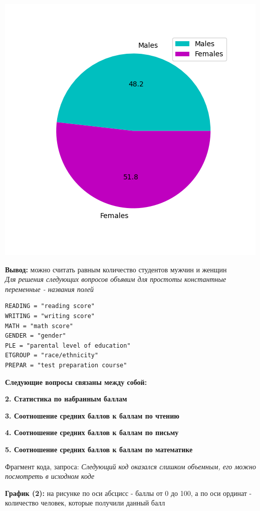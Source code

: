 \documentclass[12pt,a4paper]{article}
\begin{document}
\includegraphics{male_female_1}

\large \textbf{Вывод:} можно считать равным количество студентов мужчин и женщин\\

\textit{Для решения следующих вопросов объявим для простоты константные переменные - названия полей}

\begin{verbatim}
READING = "reading score"
WRITING = "writing score"
MATH = "math score"
GENDER = "gender"
PLE = "parental level of education"
ETGROUP = "race/ethnicity"
PREPAR = "test preparation course"
\end{verbatim}

\textbf{Следующие вопросы связаны между собой:}

\textbf{2. Статистика по набранным баллам}

\textbf{3. Соотношение средних баллов к баллам по чтению}

\textbf{4. Соотношение средних баллов к баллам по письму}

\textbf{5. Соотношение средних баллов к баллам по математике}

Фрагмент кода, запроса:
\textit{Следующий код оказался слишком объемным, его можно посмотреть в исходном коде}


\large \textbf{График (2):} на рисунке по оси абсцисс - баллы от 0 до 100, а по оси ординат - количество человек, которые получили данный балл\\
\end{document}

